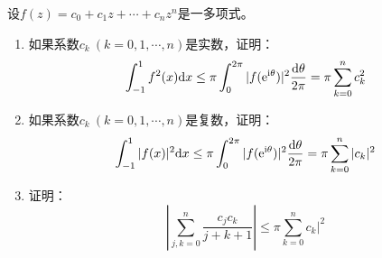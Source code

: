 \begin{proposition}

    设$f(z) = c_0 + c_1 z + \cdots + c_n z^n$是一多项式。

    \begin{enumerate}

        \item 
            如果系数$c_k\ (k = 0, 1, \cdots, n)$是实数，证明：
            \[\int_{-1}^{1}{f^2(x)}\mathrm{d} x \leq \pi \int_{0}^{2\pi}{|f(\mathrm{e}^{\mathrm{i} \theta})|^2}\dfrac{\mathrm{d} \theta}{2 \pi} = \pi \sum\limits_{k = 0}^{n}{c_k^2}\]

        \item 
            如果系数$c_k\ (k = 0, 1, \cdots, n)$是复数，证明：
            \[\int_{-1}^{1}{|f(x)|^2}\mathrm{d} x \leq \pi \int_{0}^{2\pi}{|f(\mathrm{e}^{\mathrm{i} \theta})|^2}\dfrac{\mathrm{d} \theta}{2 \pi} = \pi \sum\limits_{k = 0}^{n}{|c_k|^2}\]
        
        \item 
            证明：
            \[\left| \sum\limits_{j, k = 0}^{n}{\dfrac{c_j c_k}{j + k + 1}} \right| \leq \pi \sum\limits_{k = 0}^{n}{c_k|^2}\]

    \end{enumerate}

\end{proposition}

